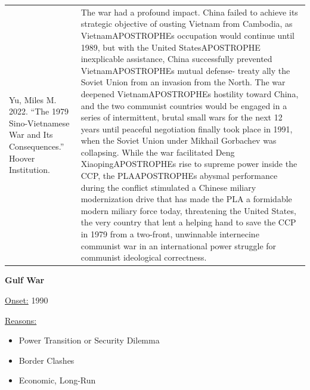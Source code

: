 {\begin{longtable}{p{}p{}}
Yu, Miles M. 2022. “The 1979 Sino-Vietnamese War and Its Consequences.” Hoover Institution. & The war had a profound impact. China failed to achieve its strategic objective of ousting Vietnam from Cambodia, as VietnamAPOSTROPHEs occupation would continue until 1989, but with the United StatesAPOSTROPHE inexplicable assistance, China successfully prevented VietnamAPOSTROPHEs mutual defense- treaty ally the Soviet Union from an invasion from the North. The war deepened VietnamAPOSTROPHEs hostility toward China, and the two communist countries would be engaged in a series of intermittent, brutal small wars for the next 12 years until peaceful negotiation finally took place in 1991, when the Soviet Union under Mikhail Gorbachev was collapsing. While the war facilitated Deng XiaopingAPOSTROPHEs rise to supreme power inside the CCP, the PLAAPOSTROPHEs abysmal performance during the conflict stimulated a Chinese miliary modernization drive that has made the PLA a formidable modern miliary force today, threatening the United States, the very country that lent a helping hand to save the CCP in 1979 from a two-front, unwinnable internecine communist war in an international power struggle for communist ideological correctness.
\\
\end{longtable}}
\clearpage
         \textbf{Gulf War} 

          \underline{Onset:} 1990         

\underline{Reasons:}
\begin{itemize}
\item Power Transition or Security Dilemma
\item Border Clashes
\item Economic, Long-Run
\end{itemize}

